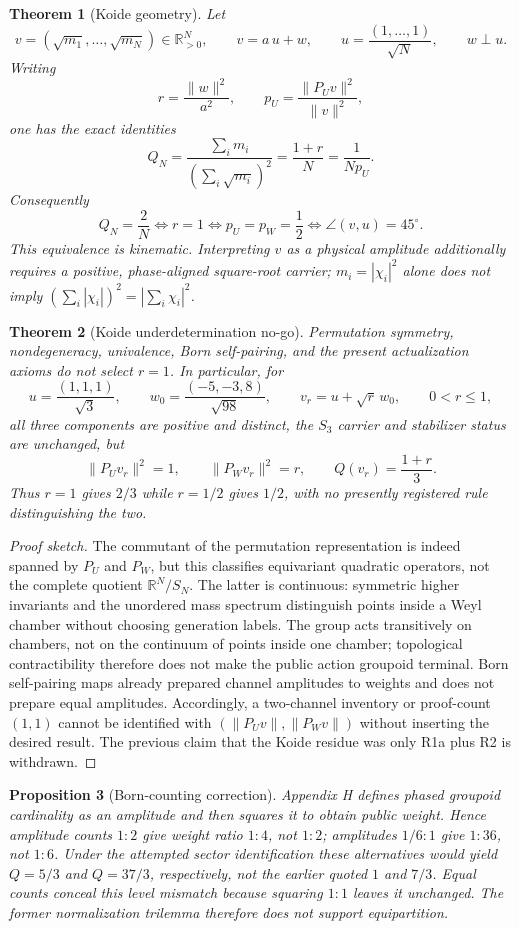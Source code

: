 \documentclass[11pt]{article}
\theoremstyle{plain}
\newtheorem{theorem}{Theorem}[section]
\newtheorem{proposition}[theorem]{Proposition}
\theoremstyle{definition}
\theoremstyle{remark}
\newenvironment{proofsketch}{\begin{proof}[Proof sketch]}{\end{proof}}
\begin{document}
\begin{theorem}[Koide geometry]
Let
\[
v=(\sqrt{m_1},\ldots,\sqrt{m_N})\in\mathbb R_{>0}^N,
\qquad
v=a\,u+w,
\qquad
u=\frac{(1,\ldots,1)}{\sqrt N},
\qquad
w\perp u.
\]
Writing
\[
r=\frac{\|w\|^2}{a^2},
\qquad
p_U=\frac{\|P_Uv\|^2}{\|v\|^2},
\]
one has the exact identities
\[
Q_N
=
\frac{\sum_i m_i}{(\sum_i\sqrt{m_i})^2}
=
\frac{1+r}{N}
=
\frac{1}{Np_U}.
\]
Consequently
\[
\boxed{
Q_N=\frac2N
\iff
r=1
\iff
p_U=p_W=\frac12
\iff
\angle(v,u)=45^\circ .}
\]
This equivalence is kinematic. Interpreting \(v\) as a physical amplitude additionally requires a positive, phase-aligned square-root carrier; \(m_i=|\chi_i|^2\) alone does not imply \((\sum_i|\chi_i|)^2=|\sum_i\chi_i|^2\).
\end{theorem}

\begin{theorem}[Koide underdetermination no-go]
Permutation symmetry, nondegeneracy, univalence, Born self-pairing, and the present actualization axioms do not select \(r=1\). In particular, for
\[
u=\frac{(1,1,1)}{\sqrt3},
\qquad
w_0=\frac{(-5,-3,8)}{\sqrt{98}},
\qquad
v_r=u+\sqrt r\,w_0,
\qquad
0<r\le1,
\]
all three components are positive and distinct, the \(S_3\) carrier and stabilizer status are unchanged, but
\[
\|P_Uv_r\|^2=1,
\qquad
\|P_Wv_r\|^2=r,
\qquad
Q(v_r)=\frac{1+r}{3}.
\]
Thus \(r=1\) gives \(2/3\) while \(r=1/2\) gives \(1/2\), with no presently registered rule distinguishing the two.
\end{theorem}

\begin{proofsketch}
The commutant of the permutation representation is indeed spanned by \(P_U\) and \(P_W\), but this classifies equivariant quadratic operators, not the complete quotient \(\mathbb R^N/S_N\). The latter is continuous: symmetric higher invariants and the unordered mass spectrum distinguish points inside a Weyl chamber without choosing generation labels. The group acts transitively on chambers, not on the continuum of points inside one chamber; topological contractibility therefore does not make the public action groupoid terminal. Born self-pairing maps already prepared channel amplitudes to weights and does not prepare equal amplitudes. Accordingly, a two-channel inventory or proof-count \((1,1)\) cannot be identified with \((\|P_Uv\|,\|P_Wv\|)\) without inserting the desired result. The previous claim that the Koide residue was only R1a plus R2 is withdrawn.
\end{proofsketch}

\begin{proposition}[Born-counting correction]
Appendix H defines phased groupoid cardinality as an amplitude and then squares it to obtain public weight. Hence amplitude counts \(1:2\) give weight ratio \(1:4\), not \(1:2\); amplitudes \(1/6:1\) give \(1:36\), not \(1:6\). Under the attempted sector identification these alternatives would yield \(Q=5/3\) and \(Q=37/3\), respectively, not the earlier quoted \(1\) and \(7/3\). Equal counts conceal this level mismatch because squaring \(1:1\) leaves it unchanged. The former normalization trilemma therefore does not support equipartition.
\end{proposition}
\end{document}
